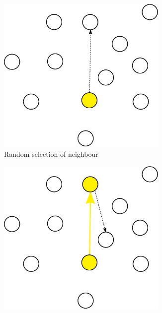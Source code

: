 \documentclass[english,a4paper,twoside]{ppfcmthesis}
\begin{document}
\begin{figure}
  \centering

  \begin{subfigure}{0.3\textwidth}
    \centering
    \includegraphics[width=0.9\textwidth]{algorithm/metaheuristic/random1.eps}
    \caption{Random selection of neighbour}
  \end{subfigure}
  \begin{subfigure}{0.3\textwidth}
    \centering
    \includegraphics[width=0.9\textwidth]{algorithm/metaheuristic/random2.eps}

\end{subfigure}
\end{figure}
\end{document}
